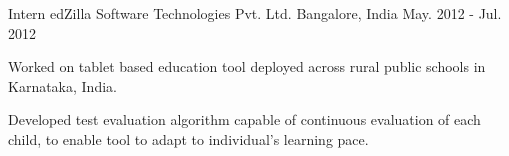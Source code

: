 \begin{cventries}
	\cventry
	{Intern}
	{edZilla Software Technologies Pvt. Ltd.}
	{Bangalore, India}
	{May. 2012 - Jul. 2012}
	{
		\begin{cvitems}
		\item{Worked on tablet based education tool deployed across rural public schools in Karnataka, India.}
		\item{Developed test evaluation algorithm capable of continuous evaluation of each child, to enable tool to adapt to individual's learning pace.}
		\end{cvitems}
	}

\end{cventries}
